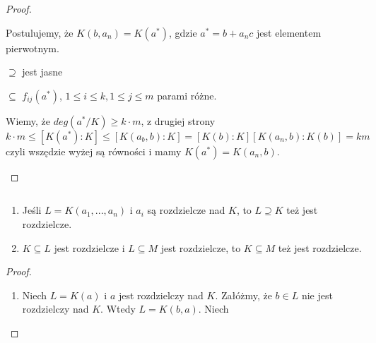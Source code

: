\begin{proof}
\begin{enumerate}
        Postulujemy, że $K(b,a_n)=K(a^*)$, gdzie $a^*=b+a_nc$ jest elementem pierwotnym.

        $\supseteq$ jest jasne

        $\subseteq$ $f_{ij}(a^*)$, $1\leq i\leq k,1\leq j\leq m$ parami różne.

        Wiemy, że $deg(a^*/K)\geq k\cdot m$, z drugiej strony
        $$k\cdot m\leq [K(a^*):K]\leq [K(a_b,b):K]=[K(b):K][K(a_n,b):K(b)]=km$$
        czyli wszędzie wyżej są równości i mamy $K(a^*)=K(a_n,b)$.
    \end{enumerate}
\end{proof}

\begin{conclusion}
    $ $\newline
    \begin{enumerate}
        \item Jeśli $L=K(a_1,...,a_n)$ i $a_i$ są rozdzielcze nad $K$, to $L\supseteq K$ też jest rozdzielcze.
        \item $K\subseteq L$ jest rozdzielcze i $L\subseteq M$ jest rozdzielcze, to $K\subseteq M$ też jest rozdzielcze.
    \end{enumerate}
\end{conclusion}
\begin{proof}
    \begin{enumerate}[leftmargin=*]
        \item Niech $L=K(a)$ i $a$ jest rozdzielczy nad $K$. Załóżmy, że $b\in L$ nie jest rozdzielczy nad $K$. Wtedy $L=K(b,a)$. Niech
    \end{enumerate}
\end{proof}































